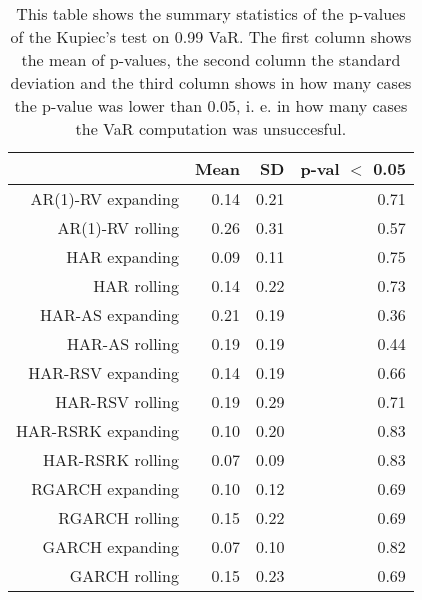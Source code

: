\begin{table}[ht]
\centering
\begin{tabular}{rrrr}
  \hline
 & Mean & SD & p-val $<$ 0.05 \\ 
  \hline
AR(1)-RV expanding & 0.14 & 0.21 & 0.71 \\ 
  AR(1)-RV rolling & 0.26 & 0.31 & 0.57 \\ 
  HAR expanding & 0.09 & 0.11 & 0.75 \\ 
  HAR rolling & 0.14 & 0.22 & 0.73 \\ 
  HAR-AS expanding & 0.21 & 0.19 & 0.36 \\ 
  HAR-AS rolling & 0.19 & 0.19 & 0.44 \\ 
  HAR-RSV expanding & 0.14 & 0.19 & 0.66 \\ 
  HAR-RSV rolling & 0.19 & 0.29 & 0.71 \\ 
  HAR-RSRK expanding & 0.10 & 0.20 & 0.83 \\ 
  HAR-RSRK rolling & 0.07 & 0.09 & 0.83 \\ 
  RGARCH expanding & 0.10 & 0.12 & 0.69 \\ 
  RGARCH rolling & 0.15 & 0.22 & 0.69 \\ 
  GARCH expanding & 0.07 & 0.10 & 0.82 \\ 
  GARCH rolling & 0.15 & 0.23 & 0.69 \\ 
   \hline
\end{tabular}
\caption[Kupiec's test p-values summary, alpha =0.99]{This table shows the summary statistics of the p-values of the Kupiec's test on 0.99 VaR. 
            The first column shows the mean of p-values, the second column the standard deviation 
            and the third column shows in how many cases the p-value was lower than 0.05, i. e. in how many cases the VaR computation was unsuccesful.} 
\label{Table:Kupiec_test_summary_0.99}
\end{table}
